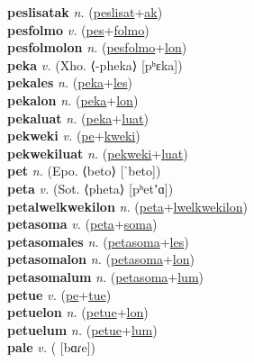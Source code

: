 \textbf{peslisatak} \textit{n.} (\hyperref[peslisat]{peslisat}+\hyperref[ak]{ak})
 \label{peslisatak} \\
\textbf{pesfolmo} \textit{v.} (\hyperref[pes]{pes}+\hyperref[folmo]{folmo})
 \label{pesfolmo} \\
\textbf{pesfolmolon} \textit{n.} (\hyperref[pesfolmo]{pesfolmo}+\hyperref[lon]{lon})
 \label{pesfolmolon} \\
\textbf{peka} \textit{v.} (Xho. ⟨-pheka⟩ [pʰɛka])
 \label{peka} \\
\textbf{pekales} \textit{n.} (\hyperref[peka]{peka}+\hyperref[les]{les})
 \label{pekales} \\
\textbf{pekalon} \textit{n.} (\hyperref[peka]{peka}+\hyperref[lon]{lon})
 \label{pekalon} \\
\textbf{pekaluat} \textit{n.} (\hyperref[peka]{peka}+\hyperref[luat]{luat})
 \label{pekaluat} \\
\textbf{pekweki} \textit{v.} (\hyperref[pe]{pe}+\hyperref[kweki]{kweki})
 \label{pekweki} \\
\textbf{pekwekiluat} \textit{n.} (\hyperref[pekweki]{pekweki}+\hyperref[luat]{luat})
 \label{pekwekiluat} \\
\textbf{pet} \textit{n.} (Epo. ⟨beto⟩ [ˈbeto])
 \label{pet} \\
\textbf{peta} \textit{v.} (Sot. ⟨pheta⟩ [pʰetʼɑ])
 \label{peta} \\
\textbf{petalwelkwekilon} \textit{n.} (\hyperref[peta]{peta}+\hyperref[lwelkwekilon]{lwelkwekilon})
 \label{petalwelkwekilon} \\
\textbf{petasoma} \textit{v.} (\hyperref[peta]{peta}+\hyperref[soma]{soma})
 \label{petasoma} \\
\textbf{petasomales} \textit{n.} (\hyperref[petasoma]{petasoma}+\hyperref[les]{les})
 \label{petasomales} \\
\textbf{petasomalon} \textit{n.} (\hyperref[petasoma]{petasoma}+\hyperref[lon]{lon})
 \label{petasomalon} \\
\textbf{petasomalum} \textit{n.} (\hyperref[petasoma]{petasoma}+\hyperref[lum]{lum})
 \label{petasomalum} \\
\textbf{petue} \textit{v.} (\hyperref[pe]{pe}+\hyperref[tue]{tue})
 \label{petue} \\
\textbf{petuelon} \textit{n.} (\hyperref[petue]{petue}+\hyperref[lon]{lon})
 \label{petuelon} \\
\textbf{petuelum} \textit{n.} (\hyperref[petue]{petue}+\hyperref[lum]{lum})
 \label{petuelum} \\
\textbf{pale} \textit{v.} ( [bɑɾe])
